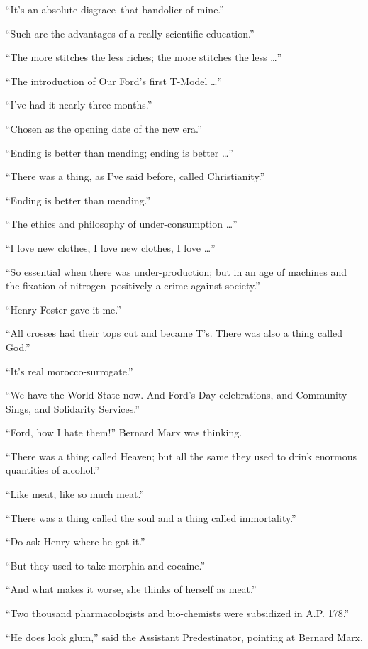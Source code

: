 \documentclass[12pt]{report}
\begin{document}
``It's an absolute disgrace--that bandolier of mine.''

``Such are the advantages of a really scientific education.''

``The more stitches the less riches; the more stitches the less
\ldots{}''

``The introduction of Our Ford's first T-Model \ldots{}''

``I've had it nearly three months.''

``Chosen as the opening date of the new era.''

``Ending is better than mending; ending is better \ldots{}''

``There was a thing, as I've said before, called Christianity.''

``Ending is better than mending.''

``The ethics and philosophy of under-consumption \ldots{}''

``I love new clothes, I love new clothes, I love \ldots{}''

``So essential when there was under-production; but in an age of
machines and the fixation of nitrogen--positively a crime against
society.''

``Henry Foster gave it me.''

``All crosses had their tops cut and became T's. There was also a thing
called God.''

``It's real morocco-surrogate.''

``We have the World State now. And Ford's Day celebrations, and
Community Sings, and Solidarity Services.''

``Ford, how I hate them!'' Bernard Marx was thinking.

``There was a thing called Heaven; but all the same they used to drink
enormous quantities of alcohol.''

``Like meat, like so much meat.''

``There was a thing called the soul and a thing called immortality.''

``Do ask Henry where he got it.''

``But they used to take morphia and cocaine.''

``And what makes it worse, she thinks of herself as meat.''

``Two thousand pharmacologists and bio-chemists were subsidized in A.P.
178.''

``He does look glum,'' said the Assistant Predestinator, pointing at
Bernard Marx.
\end{document}
